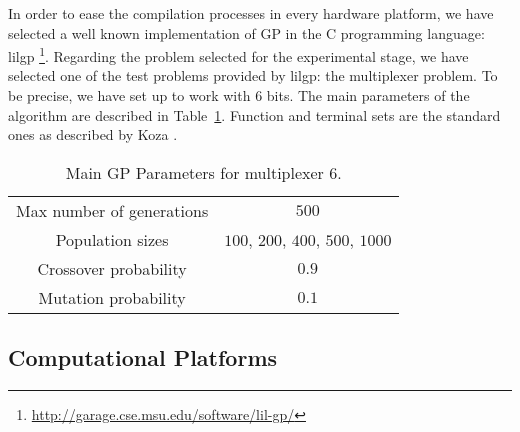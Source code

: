 In order to ease the compilation processes in every hardware platform,
we have selected a well known implementation of GP in the C
programming language:  lilgp \footnote{\url{http://garage.cse.msu.edu/software/lil-gp/}}. %
Regarding the problem selected for the experimental stage, we have
selected one of the test problems provided by lilgp: the multiplexer
problem. To be precise, we have set up to work with 6 bits. The main
parameters of the algorithm are described in Table~\ref{Table:par_gp}.
Function and terminal sets are the standard ones as described by Koza
\cite{koza}. 



\begin{table}[!t]
\centering
\caption{Main GP Parameters for multiplexer 6.}
\label{Table:par_gp}
\begin{tabular}{cc}
\hline
Max number of generations & $500$ \\
Population sizes & $100$, $200$, $400$, $500$, $1000$ \\
Crossover probability & $0.9$ \\ 
Mutation probability & $0.1$ \\ 
\hline
\end{tabular}
\end{table}


\subsection{Computational Platforms}
\label{compplat}

